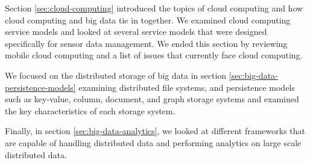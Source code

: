 \documentclass[]{article}
\begin{document}
Section \ref{sec:cloud-computing} introduced the topics of cloud computing and how cloud computing and big data tie in together. We examined cloud computing service models and looked at several service models that were designed specifically for sensor data management. We ended this section by reviewing mobile cloud computing and a list of issues that currently face cloud computing.

We focused on the distributed storage of big data in section \ref{sec:big-data-persistence-models} examining distributed file systems, and persistence models such as key-value, column, document, and graph storage systems and examined the key characteristics of each storage system.

Finally, in section \ref{sec:big-data-analytics}, we looked at different frameworks that are capable of handling distributed data and performing analytics on large scale distributed data.



\end{document}
